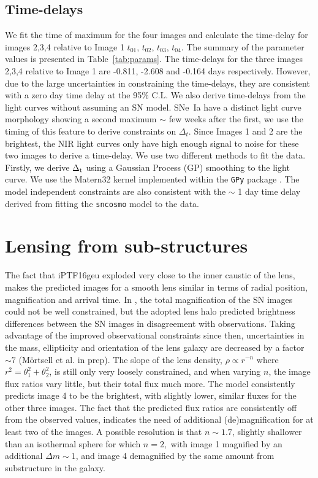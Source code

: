 \documentclass[a4paper,fleqn,usenatbib]{mnras}
\newcommand{\geu}{iPTF16geu\xspace}
\begin{document}
 \subsection{Time-delays}
\label{ssec-time_delay}
We fit the time of maximum for the four images and calculate the time-delay for images 2,3,4 relative to Image 1  $t_{01}$, $t_{02}$, $t_{03}$, $t_{04}$. The summary of the parameter values is presented in Table~\ref{tab:params}. The time-delays for the three images 2,3,4 relative to Image 1 are -0.811, -2.608 and -0.164 days respectively. However, due to the large uncertainties in constraining the time-delays, they are consistent with a zero day time delay at the 95$\%$ C.L. 
We also derive time-delays from the light curves without assuming an SN model. SNe~Ia have a distinct light curve morphology showing a second maximum $\sim$ few weeks after the first, we use the timing of this feature to derive constraints on $\Delta_t$. Since Images 1 and 2 are the brightest, the NIR light curves only have high enough signal to noise for these two images to derive a time-delay. We use two different methods to fit the data. Firstly, we derive $\Delta_{\rm t}$ using a Gaussian Process (GP) smoothing to the light curve. We use the Matern32 kernel implemented within the \texttt{GPy} package \citep{gpy2014}.
The model independent constraints are also consistent with the $\sim$ 1 day time delay derived from fitting the \texttt{sncosmo} model to the data. 

\section{Lensing from sub-structures}
\label{sec:substructure}
The fact that \geu exploded very close to the inner caustic of the lens, makes the predicted images for a smooth lens similar in terms of radial position, magnification and arrival time. 
In \citet{2017Sci...356..291G}, the total magnification of the SN images could not be well constrained, but
the adopted lens halo predicted brightness differences between the SN images in disagreement with observations.
Taking advantage of the improved observational constraints since then, uncertainties in the mass, ellipticity and orientation of the lens galaxy are decreased by a factor $\sim 7$ (M{\"o}rtsell et al. in prep).
The slope of the lens density, $\rho\propto r^{-n}$ where $r^2=\theta_1^2+\theta_2^2$, is still only very loosely constrained, and when varying $n$, the image flux ratios vary little, but their total flux much more. The model consistently predicts image 4 to be the brightest, with slightly lower, similar fluxes for the other three images. 
The fact that the predicted flux ratios are consistently off from the observed values, indicates the need of additional (de)magnification for at least two of the images. A possible resolution is that $n\sim 1.7$, slightly shallower than an isothermal sphere for which $n=2,$ with image 1 magnified by an additional $\Delta m\sim 1$, and image 4 demagnified by the same amount from substructure in the galaxy.
\end{document}
